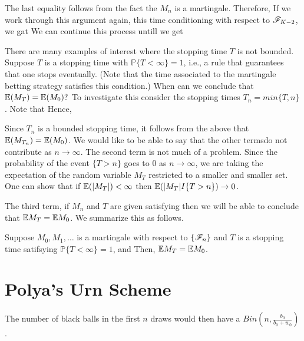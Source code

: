 \documentclass[a4paper,english,10pt]{article}
\begin{document}

The last equality follows from the fact the $M_n$ is a martingale. Therefore,
If we work through this argument again, this time conditioning with respect to $\mathscr{F}_{K-2}$, we gat
We can continue this process untill we get

There are many examples of interest where the stopping time $T$ is not bounded. Suppose $T$ is a stopping time with $\mathbb{P}\{T<\infty\}=1$, i.e., a rule that guarantees that one stops eventually. (Note that the time associated to the martingale betting strategy satisfies this condition.) When can we conclude that $\mathbb{E}(M_T)=\mathbb{E}(M_0)?$ To investigate this consider the stopping times $T_n=min\{T,n\}$. Note that
Hence,

Since $T_n$ is a bounded stopping time, it follows from the above that $\mathbb{E}(M_{T_{n}})=\mathbb{E}(M_0)$. We would like to be able to say that the other termsdo not contribute as $n\rightarrow \infty$. The second term is not much of a problem.  Since the probability of the event $\{T>n\}$ goes to 0 as $n\rightarrow \infty$, we are taking the expectation of the random variable $M_T$ restricted to a smaller and smaller set. One can show that if $\mathbb{E}(|M_T|)<\infty$ then $\mathbb{E}(|M_T|I\{T>n\}) \rightarrow 0$.

The third term, if $M_n$ and $T$ are given satisfying
then we will be able to conclude that $\mathbb{E} M_T =\mathbb{E} M_0$. 
We summarize this as follows.
\begin{thm} 
Suppose $M_0,M_1,\dots$ is a martingale with respect to $\{\mathscr{F}_n\}$ and $T$ is a stopping time satifsying $\mathbb{P}\{T<\infty\}=1$,
and
Then, $\mathbb{E} M_T =\mathbb{E} M_0$.
\end{thm}

\section{Polya's Urn Scheme}
The number of black balls in the first $n$ draws would then have a $Bin(n,\frac{b_0}{b_0+w_0})$.
\end{document}
